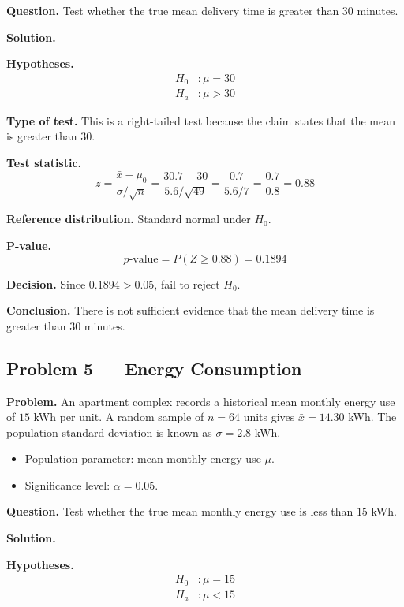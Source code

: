 \begin{ExamProblems}
\textbf{Question.} Test whether the true mean delivery time is greater than \(30\) minutes.

\textbf{Solution.}

\textbf{Hypotheses.}
\[
\begin{aligned}
H_0&: \mu = 30 \\
H_a&: \mu > 30
\end{aligned}
\]

\textbf{Type of test.} This is a right-tailed test because the claim states that the mean is greater than \(30\).

\textbf{Test statistic.}
\[
z = \frac{\bar{x}-\mu_0}{\sigma/\sqrt{n}} = \frac{30.7-30}{5.6/\sqrt{49}} = \frac{0.7}{5.6/7} = \frac{0.7}{0.8} = 0.88
\]

\textbf{Reference distribution.} Standard normal under \(H_0\).

\textbf{P-value.}
\[
p\text{-value}=P(Z\ge 0.88)=0.1894
\]

\textbf{Decision.} Since \(0.1894>0.05\), fail to reject \(H_0\).

\textbf{Conclusion.} There is not sufficient evidence that the mean delivery time is greater than \(30\) minutes.

\hypertarget{c5-ex5}{}
\item
\subsection*{Problem 5 — Energy Consumption}

\textbf{Problem.} An apartment complex records a historical mean monthly energy use of \(15\) kWh per unit. A random sample of \(n=64\) units gives \(\bar{x}=14.30\) kWh. The population standard deviation is known as \(\sigma=2.8\) kWh.
\begin{itemize}
    \item Population parameter: mean monthly energy use \(\mu\).
    \item Significance level: \(\alpha=0.05\).
\end{itemize}

\textbf{Question.} Test whether the true mean monthly energy use is less than \(15\) kWh.

\textbf{Solution.}

\textbf{Hypotheses.}
\[
\begin{aligned}
H_0&: \mu = 15 \\
H_a&: \mu < 15
\end{aligned}
\]


\end{ExamProblems}
